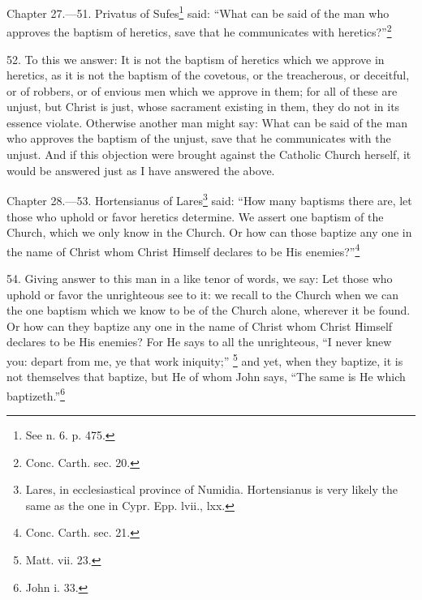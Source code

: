 
Chapter 27.—51. Privatus of Sufes\footnote{\par  See n. 6. p. 475.} said: ``What can be said of the man who approves the baptism of heretics, save that he communicates with heretics?''\footnote{\par  Conc. Carth. sec. 20.}

52. To this we answer: It is not the baptism of heretics which we approve in heretics, as it is not the baptism of the covetous, or the treacherous, or deceitful, or of robbers, or of envious men which we approve in them; for all of these are unjust, but Christ is just, whose sacrament existing in them, they do not in its essence violate. Otherwise another man might say: What can be said of the man who approves the baptism of the unjust, save that he communicates with the unjust. And if this objection were brought against the Catholic Church herself, it would be answered just as I have answered the above.


Chapter 28.—53. Hortensianus of Lares\footnote{\par  Lares, in ecclesiastical province of Numidia. Hortensianus is very likely the same as the one in Cypr. Epp. lvii., lxx.} said: ``How many baptisms there are, let those who uphold or favor heretics determine. We assert one baptism of the Church, which we only know in the Church. Or how can those baptize any one in the name of Christ whom Christ Himself declares to be His enemies?''\footnote{\par  Conc. Carth. sec. 21.}

54. Giving answer to this man in a like tenor of words, we say: Let those who uphold or favor the unrighteous see to it: we recall to the Church when we can the one baptism which we know to be of the Church alone, wherever it be found. Or how can they baptize any one in the name of Christ whom Christ Himself declares to be His enemies? For He says to all the unrighteous, ``I never knew you: depart from me, ye that work iniquity;'' \footnote{\par  Matt. vii. 23.} and yet, when they baptize, it is not themselves that baptize, but He of whom John says, ``The same is He which baptizeth.''\footnote{\par  John i. 33.}


